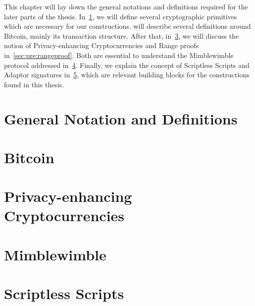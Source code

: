 This chapter will lay down the general notations and definitions required for the later parts of the thesis.
In~\cref{sec:pre:general}, we will define several cryptographic primitives which are necessary for our constructions.
 will describe several definitions around Bitcoin, mainly its transaction structure.
After that, in~\cref{sec:pre:privacy}, we will discuss the notion of Privacy-enhancing Cryptocurrencies and Range proofs in~\cref{sec:pre:rangeproof}.
Both are essential to understand the Mimblewimble protocol addressed in~\cref{sec:pre:mimblewimble}.
Finally, we explain the concept of Scriptless Scripts and Adaptor signatures in~\cref{sec:pre:scriptless-scripts}, which are relevant building blocks for the constructions found in this thesis.

\section{General Notation and Definitions}\label{sec:pre:general}


\section{Bitcoin} \label{sec:pre:bitcoin}


\section{Privacy-enhancing Cryptocurrencies} \label{sec:pre:privacy}


\section{Mimblewimble} \label{sec:pre:mimblewimble}


\section{Scriptless Scripts} \label{sec:pre:scriptless-scripts}



